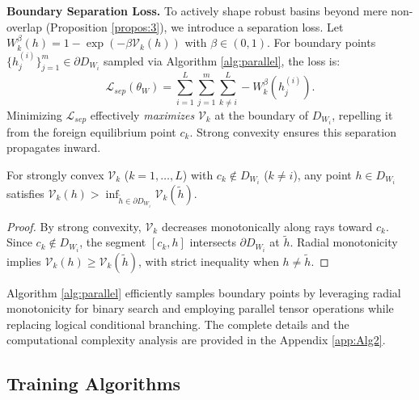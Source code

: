 \documentclass[journal]{IEEEtran}
\begin{document}
\vspace{\baselineskip}
\noindent\textbf{Boundary Separation Loss.}
To actively shape robust basins beyond mere non-overlap (Proposition \ref{propos:3}), we introduce a separation loss. Let $W_k^\beta(h) = 1 - \exp(-\beta \mathcal{V}_k(h))$ with $\beta \in (0,1)$. For boundary points $\{ h_j^{(i)} \}_{j=1}^m \in \partial D_{W_i}$ sampled via Algorithm \ref{alg:parallel}, the loss is:
\begin{equation}\label{eq:3.5}
	\mathcal{L}_{sep}(\theta_W) = \sum_{i=1}^L \sum_{j=1}^m \sum_{k \neq i}^L -W_k^\beta(h_j^{(i)}).
\end{equation}
Minimizing $\mathcal{L}_{sep}$ effectively \textit{maximizes} $\mathcal{V}_k$ at the boundary of $D_{W_i}$, repelling it from the foreign equilibrium point $c_k$. Strong convexity ensures this separation propagates inward.
\begin{proposition} \label{propos:5}
	For strongly convex $\mathcal{V}_k$ ($k = 1,\dots,L$) with $c_k \notin D_{W_i}$ ($k \neq i$), any point $h \in D_{W_i}$ satisfies $\mathcal{V}_k(h) > \inf_{\tilde{h} \in \partial D_{W_i}} \mathcal{V}_k(\tilde{h})$.
\end{proposition}
\begin{proof}
	By strong convexity, $\mathcal{V}_k$ decreases monotonically along rays toward $c_k$. Since $c_k \notin D_{W_i}$, the segment $[c_k, h]$ intersects $\partial D_{W_i}$ at $\tilde{h}$. Radial monotonicity implies $\mathcal{V}_k(h) \geq \mathcal{V}_k(\tilde{h})$, with strict inequality when $h \neq \tilde{h}$.
\end{proof}

Algorithm \ref{alg:parallel} efficiently samples boundary points by leveraging radial monotonicity for binary search and employing parallel tensor operations while replacing logical conditional branching. The complete details and the computational complexity analysis are provided in the Appendix \ref{app:Alg2}.


\subsection{Training Algorithms } \label{sec:learning_algorithms}
\end{document}
